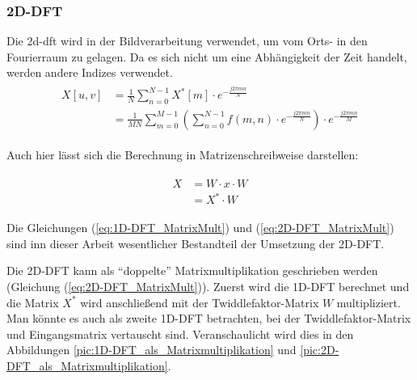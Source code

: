 \subsubsection{2D-DFT}\label{sec:2d-dft}
Die \gls{2d-dft} wird in der Bildverarbeitung verwendet, um vom Orts- in den Fourierraum zu gelagen. Da es sich nicht um eine Abhängigkeit 
der Zeit handelt, werden andere Indizes verwendet.
\begin{align}
\begin{split}
X[u,v] 	&= \frac{1}{N} \sum^{N-1}_{n=0} X^* \left[ m \right] \cdot e^{-\frac{j 2 \pi m n}{N}}\\
	&= \frac{1}{MN} \sum^{M-1}_{m=0} \left( \sum^{N-1}_{n=0} f(m,n) \cdot e^{-\frac{j 2 \pi m n}{N}} \right) \cdot e^{-\frac{j 2 \pi m n}{M}}
\end{split}
\end{align}

Auch hier lässt sich die Berechnung in Matrizenschreibweise darstellen:

\begin{align}
\begin{split}\label{eq:2D-DFT_MatrixMult}
 X &= W \cdot x \cdot W \\
                    &= X^* \cdot W
\end{split}
\end{align}

Die Gleichungen (\ref{eq:1D-DFT_MatrixMult}) und (\ref{eq:2D-DFT_MatrixMult}) sind inn dieser Arbeit wesentlicher Bestandteil der Umsetzung der 2D-DFT.


Die 2D-DFT kann als ``doppelte'' Matrixmultiplikation geschrieben werden (Gleichung (\ref{eq:2D-DFT_MatrixMult})).
Zuerst wird die 1D-DFT berechnet und die Matrix $X^*$ wird anschließend mit der Twiddlefaktor-Matrix $W$ 
multipliziert. Man könnte es auch als zweite 1D-DFT betrachten, bei der Twiddlefaktor-Matrix und Eingangsmatrix vertauscht sind.
Veranschaulicht wird dies in den Abbildungen \ref{pic:1D-DFT_als_Matrixmultiplikation} und \ref{pic:2D-DFT_als_Matrixmultiplikation}.



